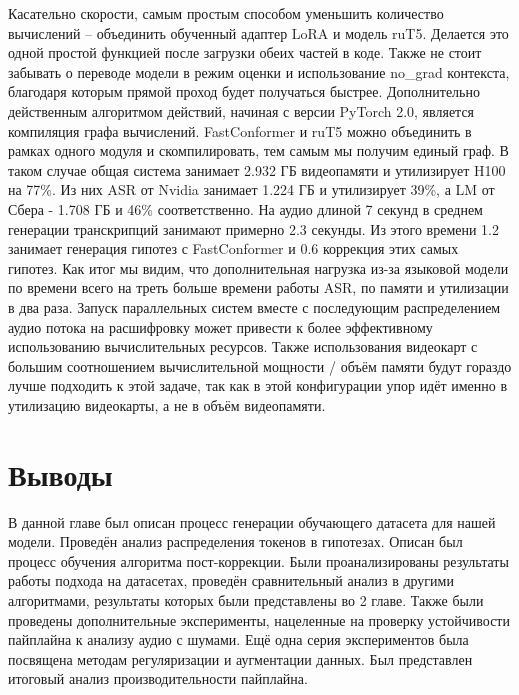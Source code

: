 Касательно скорости, самым простым способом уменьшить количество вычислений -- объединить обученный адаптер LoRA и модель ruT5.
Делается это одной простой функцией после загрузки обеих частей в коде.
Также не стоит забывать о переводе модели в режим оценки и использование no\_grad контекста, благодаря которым прямой проход будет получаться быстрее.
Дополнительно действенным алгоритмом действий, начиная с версии PyTorch 2.0, является компиляция графа вычислений.
FastConformer и ruT5 можно объединить в рамках одного модуля и скомпилировать, тем самым мы получим единый граф.
В таком случае общая система занимает 2.932 ГБ видеопамяти и утилизирует H100 на 77\%.
Из них ASR от Nvidia занимает 1.224 ГБ и утилизирует 39\%, а LM от Сбера - 1.708 ГБ и 46\% соответственно.
На аудио длиной 7 секунд в среднем генерации транскрипций занимают примерно 2.3 секунды.
Из этого времени 1.2 занимает генерация гипотез с FastConformer и 0.6 коррекция этих самых гипотез.
Как итог мы видим, что дополнительная нагрузка из-за языковой модели по времени всего на треть больше времени работы ASR, по памяти и утилизации в два раза.
Запуск параллельных систем вместе с последующим распределением аудио  потока на расшифровку может привести к более эффективному использованию вычислительных ресурсов.
Также использования видеокарт с большим соотношением вычислительной мощности / объём памяти будут гораздо лучше подходить к этой задаче, так как в этой конфигурации упор идёт именно в утилизацию видеокарты, а не в объём видеопамяти.

\section{Выводы}
В данной главе был описан процесс генерации обучающего датасета для нашей модели.
Проведён анализ распределения токенов в гипотезах.
Описан был процесс обучения алгоритма пост-коррекции.
Были проанализированы результаты работы подхода на датасетах, проведён сравнительный анализ в другими алгоритмами, результаты которых были представлены во 2 главе.
Также были проведены дополнительные эксперименты, нацеленные на проверку устойчивости пайплайна к анализу аудио с шумами.
Ещё одна серия экспериментов была посвящена методам регуляризации и аугментации данных.
Был представлен итоговый анализ производительности пайплайна.
